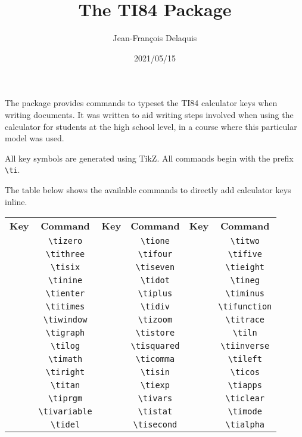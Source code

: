 \documentclass[a4paper]{article}
\title{\vspace{-3cm}The TI84 Package}
\author{Jean-François Delaquis}
\date{2021/05/15}
\begin{document}
\maketitle
The package provides commands to typeset the TI84 calculator keys when writing documents. It was written to aid writing steps involved when using the calculator for students at the high school level, in a course where this particular model was used.

All key symbols are generated using TikZ. All commands begin with the prefix \verb|\ti|.

The table below shows the available commands to directly add calculator keys inline.

\renewcommand\arraystretch{3}
\begin{center}
	\begin{tabular}{cc||cc||cc}
		\textbf{Key} & \textbf{Command} & \textbf{Key} & \textbf{Command} & \textbf{Key} & \textbf{Command}\\
		\tizero & \verb|\tizero| & \tione & \verb|\tione| & \titwo & \verb|\titwo|\\
		\tithree & \verb|\tithree| & \tifour & \verb|\tifour| & \tifive & \verb|\tifive|\\
		\tisix & \verb|\tisix| & \tiseven & \verb|\tiseven| & \tieight & \verb|\tieight|\\
		\tinine & \verb|\tinine| & \tidot & \verb|\tidot| & \tineg & \verb|\tineg|\\
		\tienter & \verb|\tienter| & \tiplus & \verb|\tiplus| & \timinus & \verb|\timinus|\\
		\titimes & \verb|\titimes| & \tidiv & \verb|\tidiv| & \tifunction & \verb|\tifunction|\\
		\tiwindow & \verb|\tiwindow| & \tizoom & \verb|\tizoom| & \titrace & \verb|\titrace|\\
		\tigraph & \verb|\tigraph| & \tistore & \verb|\tistore| & \tiln & \verb|\tiln|\\
		\tilog & \verb|\tilog| & \tisquared & \verb|\tisquared| & \tiinverse & \verb|\tiinverse|\\
		\timath & \verb|\timath| & \ticomma & \verb|\ticomma| & \tileft & \verb|\tileft|\\
		\tiright & \verb|\tiright| & \tisin & \verb|\tisin| & \ticos & \verb|\ticos|\\
		\titan & \verb|\titan| & \tiexp & \verb|\tiexp| & \tiapps & \verb|\tiapps|\\
		\tiprgm & \verb|\tiprgm| & \tivars & \verb|\tivars| & \ticlear & \verb|\ticlear|\\
		\tivariable & \verb|\tivariable| & \tistat & \verb|\tistat| & \timode & \verb|\timode|\\
		\tidel & \verb|\tidel| & \tisecond & \verb|\tisecond| & \tialpha & \verb|\tialpha|\\
	\end{tabular}
\end{center}
\end{document}
